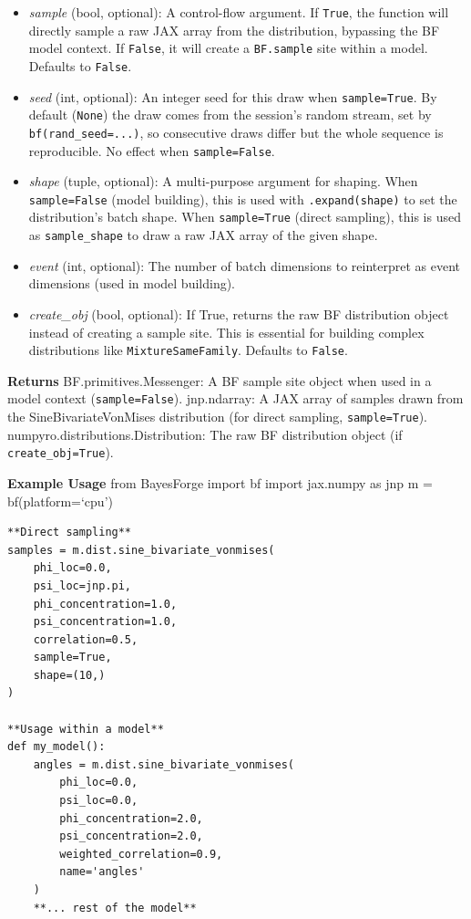 \documentclass[
  letterpaper,
  DIV=11,
  numbers=noendperiod]{scrartcl}
\begin{document}
\begin{itemize}
  mask observations. If provided, events with a \texttt{True} mask will
  be conditioned on \texttt{obs}, while the remaining events will be
  treated as latent variables. Defaults to \texttt{None}.
\item
  \emph{sample} (bool, optional): A control-flow argument. If
  \texttt{True}, the function will directly sample a raw JAX array from
  the distribution, bypassing the BF model context. If \texttt{False},
  it will create a \texttt{BF.sample} site within a model. Defaults to
  \texttt{False}.
\item
  \emph{seed} (int, optional): An integer seed for this draw when
  \texttt{sample=True}. By default (\texttt{None}) the draw comes from
  the session's random stream, set by \texttt{bf(rand\_seed=...)}, so
  consecutive draws differ but the whole sequence is reproducible. No
  effect when \texttt{sample=False}.
\item
  \emph{shape} (tuple, optional): A multi-purpose argument for shaping.
  When \texttt{sample=False} (model building), this is used with
  \texttt{.expand(shape)} to set the distribution's batch shape. When
  \texttt{sample=True} (direct sampling), this is used as
  \texttt{sample\_shape} to draw a raw JAX array of the given shape.
\item
  \emph{event} (int, optional): The number of batch dimensions to
  reinterpret as event dimensions (used in model building).
\item
  \emph{create\_obj} (bool, optional): If True, returns the raw BF
  distribution object instead of creating a sample site. This is
  essential for building complex distributions like
  \texttt{MixtureSameFamily}. Defaults to \texttt{False}.
\end{itemize}

\textbf{Returns} BF.primitives.Messenger: A BF sample site object when
used in a model context (\texttt{sample=False}). jnp.ndarray: A JAX
array of samples drawn from the SineBivariateVonMises distribution (for
direct sampling, \texttt{sample=True}).
numpyro.distributions.Distribution: The raw BF distribution object (if
\texttt{create\_obj=True}).

\textbf{Example Usage} from BayesForge import bf import jax.numpy as jnp
m = bf(platform=`cpu')

\begin{verbatim}
**Direct sampling**
samples = m.dist.sine_bivariate_vonmises(
    phi_loc=0.0,
    psi_loc=jnp.pi,
    phi_concentration=1.0,
    psi_concentration=1.0,
    correlation=0.5,
    sample=True,
    shape=(10,)
)

**Usage within a model**
def my_model():
    angles = m.dist.sine_bivariate_vonmises(
        phi_loc=0.0,
        psi_loc=0.0,
        phi_concentration=2.0,
        psi_concentration=2.0,
        weighted_correlation=0.9,
        name='angles'
    )
    **... rest of the model**
\end{verbatim}
\end{document}
